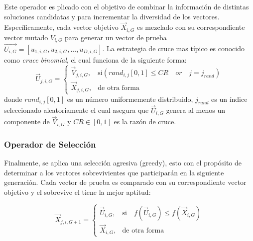 Este operador es plicado con el objetivo de combinar la información de distintas soluciones candidatas y para incrementar la diversidad de los vectores.
%
Específicamente, cada vector objetivo $\vec{X}_{i,G}$ es mezclado con su correspondiente vector mutado $V_{i,G}$ para generar un vector de prueba $\vec{U_{i,G}} = [u_{1,i,G},u_{2,i,G}, ..., u_{D,i,G} ]$.
%
La estrategia de cruce mas típico es conocido como \textit{cruce binomial}, el cual funciona de la siguiente forma:
%
\begin{equation} \label{eqn:crossover}
\vec{U}_{j,i,G}= 
\begin{cases}
    \vec{V}_{j,i,G},& \text{si} (rand_{i,j}[0,1] \leq CR \quad or \quad j = j_{rand}  )\\
    \vec{X}_{j,i,G},              & \text{de otra forma}
\end{cases}
\end{equation}
donde $rand_{i,j}[0,1]$ es un número uniformemente distribuido, $j_{rand}$ es un índice seleccionado aleatoriamente el cual asegura que $\vec{U}_{i,G}$ genera al menos un componente de $\vec{V}_{i,G}$ y $CR \in [0,1]$ es la razón de cruce.


\subsubsection{Operador de Selección}
Finalmente, se aplica una selección agresiva (greedy), esto con el propósito de determinar a los vectores sobrevivientes que participarán en la siguiente generación.
%
Cada vector de prueba es comparado con su correspondiente vector objetivo y el sobrevive el tiene la mejor aptitud:

\begin{equation} \label{eqn:selection}
\vec{X}_{j,i,G+1}= 
\begin{cases}
    \vec{U}_{i,G},& \text{si} \quad f(\vec{U}_{i,G}) \leq f(\vec{X}_{i,G})  \\
    \vec{X}_{i,G},              & \text{de otra forma}
\end{cases}
\end{equation}

